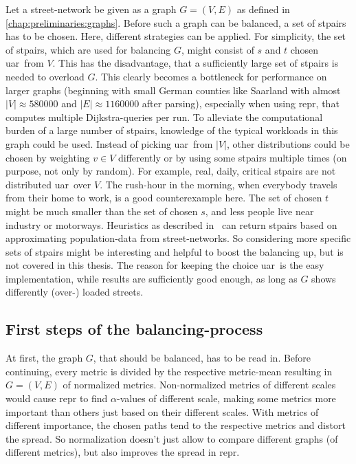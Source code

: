         Let a street-network be given as a graph $G = (V, E)$ as defined in \cref{chap:preliminaries:graphs}.
        Before such a graph can be balanced, a set of \glspl{stpair} has to be chosen.
        Here, different strategies can be applied.
        For simplicity, the set of \glspl{stpair}, which are used for balancing $G$, might consist of $s$ and $t$ chosen \gls{uar}\ from $V$.
        This has the disadvantage, that a sufficiently large set of \glspl{stpair} is needed to overload $G$.
        This clearly becomes a bottleneck for performance on larger graphs (beginning with small German counties like Saarland with almost $|V| \approx \num{580000}$ and $|E| \approx \num{1160000}$ after parsing), especially when using \gls{repr}, that computes multiple Dijkstra-queries per run.
        To alleviate the computational burden of a large number of \glspl{stpair}, knowledge of the typical workloads in this graph could be used.
        Instead of picking \gls{uar}\ from $|V|$, other distributions could be chosen by weighting $v \in V$ differently or by using some \glspl{stpair} multiple times (on purpose, not only by random).
        For example, real, daily, critical \glspl{stpair} are not distributed \gls{uar}\ over $V$.
        The rush-hour in the morning, when everybody travels from their home to work, is a good counterexample here.
        The set of chosen $t$ might be much smaller than the set of chosen $s$, and less people live near industry or motorways.
        Heuristics as described in~\cite{bakillah:population_from_osm} can return \glspl{stpair} based on approximating population-data from street-networks.
        So considering more specific sets of \glspl{stpair} might be interesting and helpful to boost the balancing up, but is not covered in this thesis.
        The reason for keeping the choice \gls{uar}\ is the easy implementation, while results are sufficiently good enough, as long as $G$ shows differently (over-) loaded streets.

    \subsection{First steps of the balancing-process}
    \label{chap:balancing:balancing}

        At first, the graph $G$, that should be balanced, has to be read in.
        Before continuing, every metric is divided by the respective metric-mean resulting in $G = (V, E)$ of normalized metrics.
        Non-normalized metrics of different scales would cause \gls{repr} to find $\alpha$-values of different scale, making some metrics more important than others just based on their different scales.
        With metrics of different importance, the chosen paths tend to the respective metrics and distort the spread.
        So normalization doesn't just allow to compare different graphs (of different metrics), but also improves the spread in \gls{repr}.

